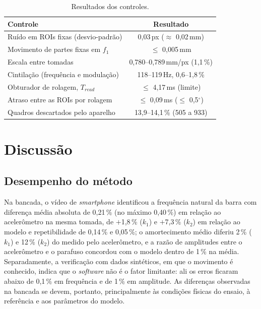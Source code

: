 \documentclass[a4paper,10pt,twocolumn]{article}
\begin{document}
\begin{table}[H]
    \centering
    \caption{Resultados dos controles.}
    \label{tab:res_controles}
    \small
    \begin{tabularx}{\columnwidth}{X c}
        \toprule
        \textbf{Controle} & \textbf{Resultado} \\
        \midrule
        Ruído em ROIs fixas (desvio-padrão) & 0,03\,px ($\approx$ 0,02\,mm) \\
        Movimento de partes fixas em $f_1$ & $\leq$ 0,005\,mm \\
        Escala entre tomadas & 0,780--0,789\,mm/px (1,1\,\%) \\
        Cintilação (frequência e modulação) & 118--119\,Hz, 0,6--1,8\,\% \\
        Obturador de rolagem, $T_{read}$ & $\leq$ 4,17\,ms (limite) \\
        Atraso entre as ROIs por rolagem & $\leq$ 0,09\,ms ($\leq$ 0,5$^\circ$) \\
        Quadros descartados pelo aparelho & 13,9--14,1\,\% (505 a 933) \\
        \bottomrule
    \end{tabularx}
\end{table}


\section{Discussão}


\subsection{Desempenho do método}

Na bancada, o vídeo de \textit{smartphone} identificou a frequência natural da barra com diferença média absoluta de 0,21\,\% (no máximo 0,40\,\%) em relação ao acelerômetro na mesma tomada, de $+$1,8\,\% ($k_1$) e $+$7,3\,\% ($k_2$) em relação ao modelo e repetibilidade de 0,14\,\% e 0,05\,\%; o amortecimento médio diferiu 2\,\% ($k_1$) e 12\,\% ($k_2$) do medido pelo acelerômetro, e a razão de amplitudes entre o acelerômetro e o parafuso concordou com o modelo dentro de 1\,\% na média. Separadamente, a verificação com dados sintéticos, em que o movimento é conhecido, indica que o \textit{software} não é o fator limitante: ali os erros ficaram abaixo de 0,1\,\% em frequência e de 1\,\% em amplitude. As diferenças observadas na bancada se devem, portanto, principalmente às condições físicas do ensaio, à referência e aos parâmetros do modelo.
\end{document}
